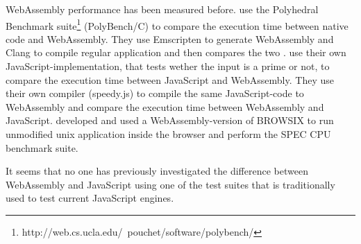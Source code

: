 WebAssembly performance has been measured before. \textcite{HaasRossbergSchuffTitzerHolmanGohmanWagnerZakaiBastien2017} use the Polyhedral Benchmark suite\footnote{http://web.cs.ucla.edu/~pouchet/software/polybench/} (PolyBench/C) to compare the execution time between native code and WebAssembly. They use Emscripten to generate WebAssembly and Clang \parencite{LattnerAdve2014} to compile regular application and then compares the two \parencite{HaasRossbergSchuffTitzerHolmanGohmanWagnerZakaiBastien2017}. \textcite{ReiserBlaser2017} use their own JavaScript-implementation, that tests wether the input is a prime or not, to compare the execution time between JavaScript and WebAssembly. They use their own compiler (speedy.js) to compile the same JavaScript-code to WebAssembly and compare the execution time between WebAssembly and JavaScript. \textcite{JangdaPowersGuhaBerger2019} developed and used a WebAssembly-version of BROWSIX to run unmodified unix application inside the browser and perform the SPEC CPU benchmark suite.

It seems that no one has previously investigated the difference between WebAssembly and JavaScript using one of the test suites that is traditionally used to test current JavaScript engines.


